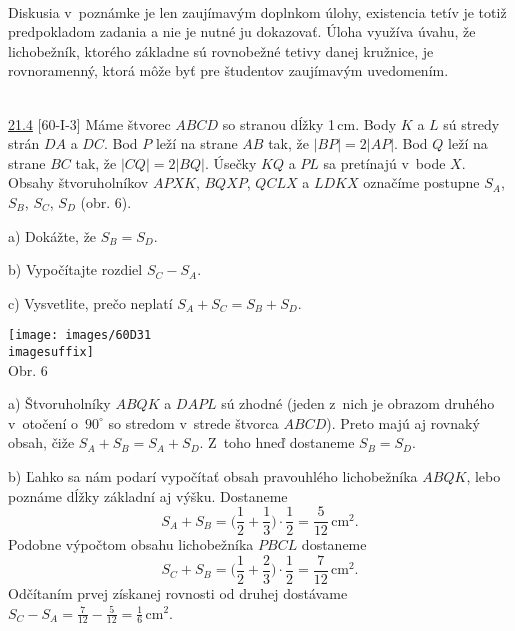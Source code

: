 \\
\kom Diskusia v~poznámke je len zaujímavým doplnkom úlohy, existencia tetív je totiž predpokladom zadania a nie je nutné ju dokazovať. Úloha využíva úvahu, že lichobežník, ktorého základne sú rovnobežné tetivy danej kružnice, je rovnoramenný, ktorá môže byť pre študentov zaujímavým uvedomením.\\
\\
\begin{tcolorbox}[breakable,notitle,boxrule=0pt,colback=light-gray,colframe=light-gray]\ul{21.4} [60-I-3]  Máme štvorec $ABCD$ so stranou dĺžky 1\,cm. Body $K$ a $L$ sú stredy strán $DA$ a $DC$. Bod $P$ leží na strane $AB$ tak, že $| BP | = 2 | AP |$. Bod $Q$ leží na strane $BC$ tak, že $| CQ | = 2 | BQ |$. Úsečky $KQ$ a $PL$ sa pretínajú v~bode $X$. Obsahy štvoruholníkov $APXK$, $BQXP$, $QCLX$ a $LDKX$ označíme postupne $S_A$, $S_B$, $S_C$, $S_D$ (obr. 6).

a) Dokážte, že $S_B = S_D$.

b) Vypočítajte rozdiel $S_C - S_A$.

c) Vysvetlite, prečo neplatí $S_A + S_C = S_B + S_D$.
\begin{center}
\texttt{[image: images/60D31\\imagesuffix]}\\

Obr. 6
\end{center}
\end{tcolorbox}

\rieh  a) Štvoruholníky $ABQK$ a $DAPL$ sú zhodné (jeden z~nich je obrazom druhého v~otočení o~$90^\circ$ so stredom v~strede štvorca $ABCD$). Preto majú aj rovnaký obsah, čiže $S_A + S_B = S_A + S_D$. Z~toho hneď dostaneme $S_B = S_D$.

b) Ľahko sa nám podarí vypočítať obsah pravouhlého lichobežníka $ABQK$, lebo poznáme dĺžky základní aj výšku. Dostaneme
$$S_A + S_B =\bigg( \frac{1}{2}+\frac{1}{3}\bigg)\cdot \frac{1}{2}=\frac{5}{12}\,\text{cm}^2.$$
Podobne výpočtom obsahu lichobežníka $PBCL$ dostaneme
$$S_C + S_B =\bigg(\frac{1}{2}+\frac{2}{3}\bigg)\cdot\frac{1}{2}=\frac{7}{12}\,\text{cm}^2.$$
Odčítaním prvej získanej rovnosti od druhej dostávame $S_C - S_A =\frac{7}{12}-\frac{5}{12}=\frac{1}{6}\,\text{cm}^2$.

